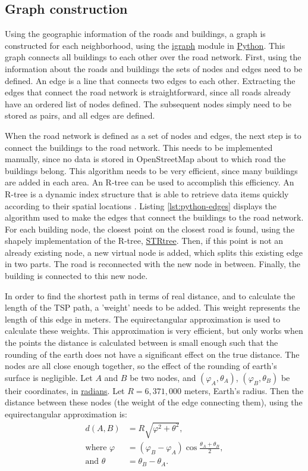 \subsection{Graph construction}
Using the geographic information of the roads and buildings, a graph
is constructed for each neighborhood, using the \url{igraph} module in \url{Python}. This graph
connects all buildings to each other over the road network. First, using the information about the
roads and buildings the sets of nodes and edges need to be defined. An edge is a line that connects
two edges to each other. Extracting the edges that connect the road network is straightforward,
since all roads already have an ordered list of nodes defined. The subsequent nodes simply need to
be stored as pairs, and all edges are defined.

When the road network is defined as a set of nodes and edges, the next step is to connect the buildings
to the road network. This needs to be implemented manually, since no data is stored in OpenStreetMap
about to which road the buildings belong. This algorithm needs to be very efficient, since many
buildings are added in each area. An R-tree can be used to accomplish this efficiency.
An R-tree is a dynamic index structure that is able to retrieve data items quickly according to
their spatial locations \citep{guttman1984r}. Listing \ref{lst:python-edges} displays the algorithm
used to make the edges that connect the buildings to the road network. For each building node,
the closest point on the closest road is found, using the shapely implementation of the R-tree,
\url{STRtree}. Then, if this point is not an already existing node, a new virtual node is added,
which splits this existing edge in two parts. The road is reconnected with the new node in between.
Finally, the building is connected to this new node.

In order to find the shortest path in terms of real distance, and to calculate the length of the
TSP path, a 'weight' needs to be added. This weight represents the length of this edge in meters.
The equirectangular approximation is used to calculate these weights. This approximation is very
efficient, but only works when the points the distance is calculated between is small enough such
that the rounding of the earth does not have a significant effect on the true distance.
The nodes are all close enough together, so the effect of the
rounding of earth's surface is negligible. Let $A$ and $B$ be two nodes,
and $(\varphi_A,\theta_A)$, $(\varphi_B,\theta_B)$ be their coordinates, in \url{radians}. Let $R=6,371,000$ meters,
Earth's radius. Then the distance between these nodes (the weight of the edge connecting them),
using the equirectangular approximation is:
\begin{align}
	\label{eq:equirectangluar_approx}
	d(A,B)               & =R\sqrt{\varphi^2+\theta^2},                             \\
	\text{where }\varphi & =(\varphi_B-\varphi_A)\cos{\frac{\theta_A+\theta_B}{2}}, \\
	\text{and }\theta    & =\theta_B-\theta_A.
\end{align}

